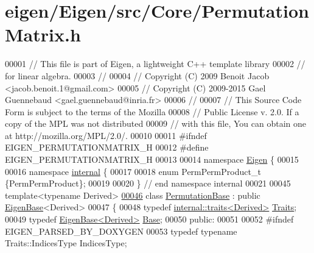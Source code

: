 \hypertarget{eigen_2_eigen_2src_2_core_2_permutation_matrix_8h_source}{}\section{eigen/\+Eigen/src/\+Core/\+Permutation\+Matrix.h}
\label{eigen_2_eigen_2src_2_core_2_permutation_matrix_8h_source}

\begin{DoxyCode}
00001 \textcolor{comment}{// This file is part of Eigen, a lightweight C++ template library}
00002 \textcolor{comment}{// for linear algebra.}
00003 \textcolor{comment}{//}
00004 \textcolor{comment}{// Copyright (C) 2009 Benoit Jacob <jacob.benoit.1@gmail.com>}
00005 \textcolor{comment}{// Copyright (C) 2009-2015 Gael Guennebaud <gael.guennebaud@inria.fr>}
00006 \textcolor{comment}{//}
00007 \textcolor{comment}{// This Source Code Form is subject to the terms of the Mozilla}
00008 \textcolor{comment}{// Public License v. 2.0. If a copy of the MPL was not distributed}
00009 \textcolor{comment}{// with this file, You can obtain one at http://mozilla.org/MPL/2.0/.}
00010 
00011 \textcolor{preprocessor}{#ifndef EIGEN\_PERMUTATIONMATRIX\_H}
00012 \textcolor{preprocessor}{#define EIGEN\_PERMUTATIONMATRIX\_H}
00013 
00014 \textcolor{keyword}{namespace }\hyperlink{namespace_eigen}{Eigen} \{ 
00015 
00016 \textcolor{keyword}{namespace }\hyperlink{namespaceinternal}{internal} \{
00017 
00018 \textcolor{keyword}{enum} PermPermProduct\_t \{PermPermProduct\};
00019 
00020 \} \textcolor{comment}{// end namespace internal}
00021 
00045 \textcolor{keyword}{template}<\textcolor{keyword}{typename} Derived>
\hyperlink{group___core___module}{00046} \textcolor{keyword}{class }\hyperlink{group___core___module_class_eigen_1_1_permutation_base}{PermutationBase} : \textcolor{keyword}{public} \hyperlink{group___core___module_struct_eigen_1_1_eigen_base}{EigenBase}<Derived>
00047 \{
00048     \textcolor{keyword}{typedef} \hyperlink{struct_eigen_1_1internal_1_1traits}{internal::traits<Derived>} \hyperlink{struct_eigen_1_1internal_1_1traits}{Traits};
00049     \textcolor{keyword}{typedef} \hyperlink{group___core___module_struct_eigen_1_1_eigen_base}{EigenBase<Derived>} \hyperlink{group___core___module_struct_eigen_1_1_eigen_base}{Base};
00050   \textcolor{keyword}{public}:
00051 
00052 \textcolor{preprocessor}{    #ifndef EIGEN\_PARSED\_BY\_DOXYGEN}
00053     \textcolor{keyword}{typedef} \textcolor{keyword}{typename} Traits::IndicesType IndicesType;

\end{DoxyCode}
